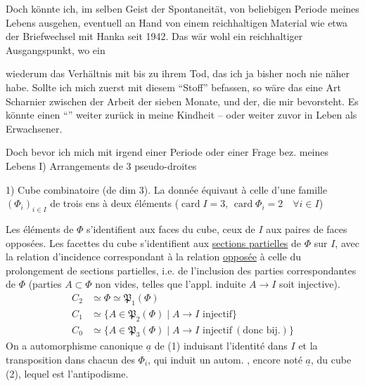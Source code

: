 Doch könnte ich, im selben Geist der Spontaneität, von  beliebigen Periode meines Lebens ausgehen, eventuell an Hand von einem reichhaltigen Material wie etwa der Briefwechsel mit Hanka seit 1942. Das wär wohl ein reichhaltiger Ausgangspunkt, wo ein 

wiederum das Verhältnis mit  bis zu ihrem Tod, das ich ja bisher noch nie näher  habe. Sollte ich mich zuerst mit diesem ``Stoff'' befassen, so wäre das eine Art Scharnier zwischen der Arbeit der  sieben Monate, und der, die mir bevorsteht. Es könnte  einen ``''   weiter zurück in meine Kindheit -- oder weiter zuvor in  Leben als Erwachsener.

Doch bevor ich mich  mit irgend einer Periode oder einer Frage bez. meines Lebens 
I) Arrangements de $3$ pseudo-droites

1) Cube combinatoire (de dim 3). La donnée équivaut à celle d'une famille $(\Phi_i)_{i\in I}$ de trois ens à deux éléments ($\operatorname{card} I=3$, $\operatorname{card}\Phi_i=2\quad\forall i\in I$)

Les éléments de $\Phi$ s'identifient aux faces du cube, ceux de $I$ aux paires de faces opposées. Les facettes du cube s'identifient aux \uline{sections partielles} de $\Phi$ sur  $I$, avec la relation d'incidence correspondant à la relation \uline{opposée} à celle du prolongement de sections partielles, i.e. de l'inclusion des parties correspondantes de $\Phi$ (parties $A\subset\Phi$ non vides, telles que l'appl. induite $A\to I$ soit injective).
\[
\begin{aligned}
 C_2&\simeq\Phi\simeq\mathfrak P_1(\Phi)\\
 C_1&\simeq\{A\in\mathfrak P_2(\Phi)\mid A\to I\text{ injectif}\}\\
 C_0&\simeq\{A\in\mathfrak P_3(\Phi)\mid A\to I\text{ injectif}\ (\text{donc bij.})\}
\end{aligned}\tag*{(2)}
\]
On a  automorphisme  canonique $\underline a$ de (1) induisant l'identité dans $I$ et la transposition dans chacun des $\Phi_i$, qui induit un autom. , encore noté $\underline a$, du cube (2), lequel est l'antipodisme.

